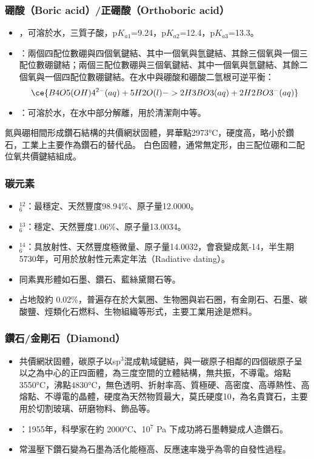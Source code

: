 \documentclass[a4paper,12pt]{report}
\begin{document}
\subsubsection{硼酸（Boric acid）/正硼酸（Orthoboric acid）}
\begin{itemize}
\item {}，可溶於水，三質子酸，p$K_{a1}$=9.24，p$K_{a2}$=12.4，p$K_{a3}$=13.3。
\item {}：兩個四配位數硼與四個氧鍵結、其中一個氧與氫鍵結、其餘三個氧與一個三配位數硼鍵結；兩個三配位數硼與三個氧鍵結、其中一個氧與氫鍵結、其餘二個氧與一個四配位數硼鍵結。在水中與硼酸和硼酸二氫根可逆平衡：
\[\ce{B4O5(OH)4^{2-}(aq) + 5H2O(l) -> 2H3BO3(aq) + 2H2BO3^-(aq)}\]
\item {}：可溶於水，在水中部分解離，用於清潔劑中等。
\end{itemize}
氮與硼相間形成鑽石結構的共價網狀固體，昇華點2973°C，硬度高，略小於鑽石，工業上主要作為鑽石的替代品。
白色固體，通常無定形，由三配位硼和二配位氧共價鍵結組成。
\subsubsection{碳元素}
\begin{itemize}
\item $^{12}_6$\rmC：最穩定、天然豐度98.94\%、原子量12.0000。
\item $^{13}_6$\rmC：穩定、天然豐度1.06\%、原子量13.0034。
\item $^{14}_6$\rmC：具放射性、天然豐度極微量、原子量14.0032，會衰變成氮-14，半生期5730年，可用於放射性元素定年法（Radiative dating）。
\item 同素異形體如石墨、鑽石、藍絲黛爾石等。
\item 占地殼約 0.02\%，普遍存在於大氣圈、生物圈與岩石圈，有金剛石、石墨、碳酸鹽、烴類化石燃料、生物組織等形式，主要工業用途是燃料。
\end{itemize}
\subsubsection{鑽石/金剛石（Diamond）}
\begin{itemize}
\item 共價網狀固體，碳原子以sp$^3$混成軌域鍵結，與一碳原子相鄰的四個碳原子呈以之為中心的正四面體，為三度空間的立體結構，無共振，不導電。熔點3550°C，沸點4830°C，無色透明、折射率高、質極硬、高密度、高導熱性、高熔點、不導電的晶體，硬度為天然物質最大，莫氏硬度10，為名貴寶石，主要用於切割玻璃、研磨物料、飾品等。
\item {}：1955年，科學家在約 2000°C、10$^7$ Pa 下成功將石墨轉變成人造鑽石。
\item 常溫壓下鑽石變為石墨為活化能極高、反應速率幾乎為零的自發性過程。
\end{itemize}
\end{document}
